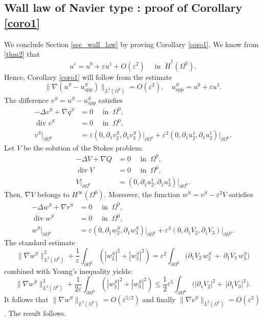 \documentclass[10pt]{amsart}
\newcommand{\app}{\mathrm{app}}
\renewcommand{\div}{\operatorname{div}}
\theoremstyle{plain}
\theoremstyle{definition}
\let\pa\partial
\let\na\nabla
\let\eps\varepsilon
\begin{document}
\subsection{Wall law of Navier type : proof of Corollary \ref{coro1}}
We conclude Section \ref{sec_wall_law} by proving Corollary \ref{coro1}.
We know from \eqref{thm2} that
\[
u^\eps = u^0 + \eps u^1 + O(\eps^2) \quad \text{ in } \: \dot{H}^1(\Omega^0).
\]
Hence, Corollary \ref{coro1} will follow from the estimate
\[
\|\na (u^S - u^S_{\app})\|_{L^2(\Omega^0)} = O(\eps^2), \quad u^S_{\app} = u^0 + \eps u^1.
\]
The difference $v^{S} = u^S - u^S_{\app}$ satisfies
\begin{equation*}
\begin{aligned}
-\Delta v^S + \na q^S & = 0 \quad \text{ in } \: \Omega^0, \\
\div v^S & = 0 \quad \text{ in } \: \Omega^0, \\
v^S\vert_{\pa \Omega^0} & = \eps (0, \pa_1 v^S_2, \pa_1 v^S_3)\vert_{\pa \Omega^0} + \eps^2 (0, \pa_1 u^1_2, \pa_1 u^1_3)\vert_{\pa \Omega^0}.
\end{aligned}
\end{equation*}
Let $V$ be the solution of the Stokes problem:
\begin{equation*}
\begin{aligned}
-\Delta V + \na Q & = 0 \quad \text{ in } \: \Omega^0, \\
\div V & = 0 \quad \text{ in } \: \Omega^0, \\
V\vert_{\pa \Omega^0} & = (0, \pa_1 u^1_2, \pa_1 u^1_3)\vert_{\pa \Omega^0}.
\end{aligned}
\end{equation*}
Then, $\na V$ belongs to $H^\infty(\Omega^0)$. Moreover, the function $w^S = v^S - \eps^2 V$ satisfies
\begin{equation*}
\begin{aligned}
-\Delta w^S + \na r^S & = 0 \quad \text{ in } \: \Omega^0, \\
\div w^S & = 0 \quad \text{ in } \: \Omega^0, \\
w^S\vert_{\pa \Omega^0} & = \eps (0, \pa_1 w^S_2, \pa_1 w^S_3)\vert_{\pa \Omega^0} + \eps^3 (0, \pa_1 V_2, \pa_1 V_3)\vert_{\pa \Omega^0}.
\end{aligned}
\end{equation*}
The standard estimate
\begin{equation*}
\|\na w^S\|_{L^2(\Omega^0)}^2 + \frac{1}{\eps} \int_{\pa \Omega^0}
(|w^S_2|^2 + |w^S_3|^2) = \eps^2 \int_{\pa \Omega^0} \big(\pa_1 V_2 \, w^S_2 \: + \: \pa_1 V_3 \, w^S_3\big)
\end{equation*}
combined with Young's inequality yields:
\begin{equation*}
\|\na w^S\|_{L^2(\Omega^0)}^2 + \frac{1}{2\eps} \int_{\pa \Omega^0} (|w^S_2|^2 + |w^S_3|^2) \le \frac{1}{2}\eps^5 \int_{\pa \Omega^0} \big(|\pa_1 V_2|^2 + \, |\pa_1 V_3|^2 \big).
\end{equation*}
It follows that
$\|\na w^S\|_{L^2(\Omega^0)} = O(\eps^{5/2})$ and finally $\|\na v^S\|_{L^2(\Omega^0)} = O(\eps^2)$. The result follows.
\end{document}
